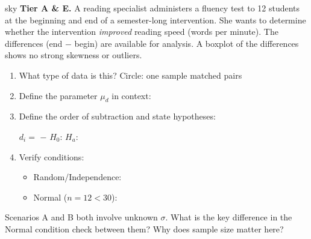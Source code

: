 \documentclass[10pt]{article}
\begin{document}
\begin{scenariobox}{sky}
\textbf{Tier A \& E.} \quad
A reading specialist administers a fluency test to 12 students at the beginning and end of a
semester-long intervention. She wants to determine whether the intervention \emph{improved}
reading speed (words per minute). The differences (end $-$ begin) are available for analysis.
A boxplot of the differences shows no strong skewness or outliers.

\begin{enumerate}[label=\alph*.]
  \item What type of data is this? Circle: \quad one sample \quad matched pairs

  \item Define the parameter $\mu_d$ in context: \writeline

  \item Define the order of subtraction and state hypotheses:

        $d_i = $ \blank{3cm} $-$ \blank{3cm} \qquad $H_0$: \blank{3.5cm} \quad $H_a$: \blank{3.5cm}

  \item Verify conditions:
        \begin{itemize}
          \item Random/Independence: \writeline
          \item Normal ($n = 12 < 30$): \writeline
        \end{itemize}
\end{enumerate}
\end{scenariobox}

\begin{reflectionbox}
Scenarios A and B both involve unknown $\sigma$. What is the key difference in the Normal
condition check between them? Why does sample size matter here?
\end{reflectionbox}
\end{document}
